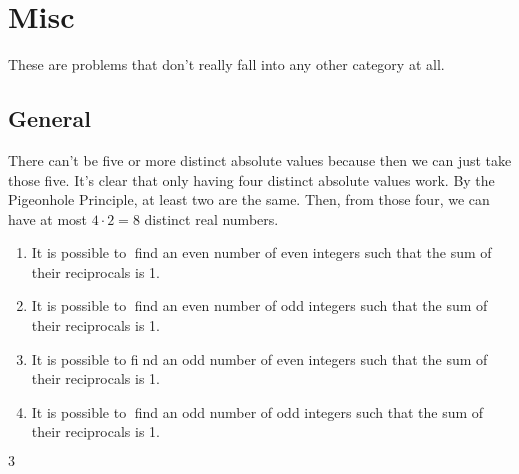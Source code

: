 \documentclass[11pt]{article}
\begin{document}
\section{Misc}
These are problems that don't really fall into any other category at all.

\subsection{General}

\begin{sol}
There can't be five or more distinct absolute values because then we can just take those five. It's clear that only having four distinct absolute values work. By the Pigeonhole Principle, at least two are the same. Then, from those four, we can have at most $4\cdot 2=\boxed{8}$ distinct real numbers.
\end{sol}


\begin{enumerate}
	\item It is possible to find an even number of even integers such that the sum of their reciprocals is 1.

	\item It is possible to find an even number of odd integers such that the sum of their reciprocals is 1.

	\item It is possible to find an odd number of even integers such that the sum of their reciprocals is 1.

	\item It is possible to find an odd number of odd integers such that the sum of their reciprocals is 1.
\end{enumerate}

\begin{sol}
$\boxed{3}$
\end{sol}

\end{document}
